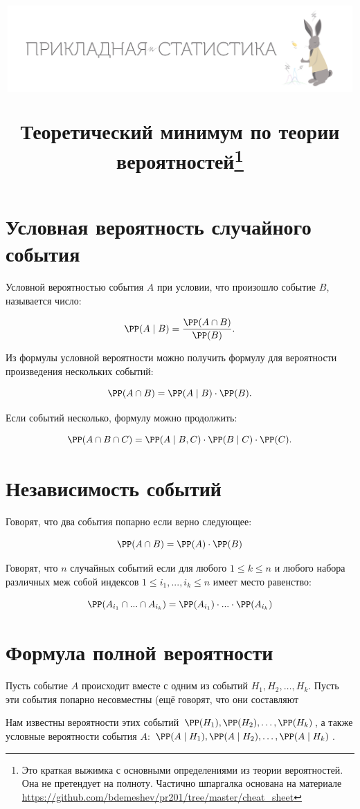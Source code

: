 \documentclass[12pt, a4paper, oneside]{article}
\title{\begin{center} \includegraphics[width=0.99\textwidth]{logo.png}\end{center}Теоретический минимум по теории вероятностей\footnote{Это краткая выжимка с основными определениями из теории вероятностей. Она не претендует на полноту. Частично шпаргалка основана на материале \url{https://github.com/bdemeshev/pr201/tree/master/cheat_sheet}}}
\date{ } %
\begin{document}

\maketitle

\section{Условная вероятность случайного события}

Условной вероятностью события $A$ при условии, что произошло событие $B$, называется число:

$$
\PP(A \mid B) = \frac{\PP(A \cap B)}{\PP(B)}.
$$

Из формулы условной вероятности можно получить формулу для вероятности произведения нескольких событий: 

$$
\PP(A \cap B) = \PP(A \mid B) \cdot \PP(B).
$$

Если событий несколько, формулу можно продолжить:

$$
\PP(A \cap B \cap C) = \PP(A \mid B, C) \cdot \PP(B \mid C) \cdot \PP(C).
$$

\newpage

\section{Независимость событий}

Говорят, что два события попарно  если верно следующее:

$$
\PP(A \cap B) = \PP(A) \cdot \PP(B)
$$

Говорят, что $n$ случайных событий  если для любого $1 \leq k \leq n$ и любого набора различных меж собой индексов $1 \leq i_1, ..., i_k \leq n$ имеет место равенство:

$$
\PP(A_{i_1} \cap ... \cap A_{i_k}) = \PP(A_{i_1}) \cdot ... \cdot \PP(A_{i_k})
$$


\section{Формула полной вероятности}

Пусть событие $A$ происходит вместе с одним из событий $H_1, H_2, \ldots, H_k.$ Пусть эти события попарно несовместны (ещё говорят, что они составляют  

Нам известны вероятности этих событий $\PP(H_1), \PP(H_2), \ldots, \PP(H_k)$, а также условные вероятности события $A$:  $\PP(A \mid H_1), \PP(A \mid H_2), \ldots, \PP(A \mid H_k)$.
\end{document}
